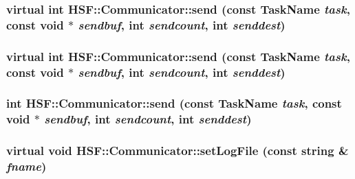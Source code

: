 \label{classHSF_1_1Communicator_a1678c6aa967e7aa1a54f760c8e6abeaa}
\hypertarget{classHSF_1_1Communicator_a29a10dcfc67e9256334db3afd37b8110}{
\subsubsection[{send}]{\setlength{\rightskip}{0pt plus 5cm}virtual int HSF::Communicator::send (const {\bf TaskName} {\em task}, \/  const void $\ast$ {\em sendbuf}, \/  int {\em sendcount}, \/  int {\em senddest})}}
\label{classHSF_1_1Communicator_a29a10dcfc67e9256334db3afd37b8110}
\hypertarget{classHSF_1_1Communicator_a29a10dcfc67e9256334db3afd37b8110}{
\subsubsection[{send}]{\setlength{\rightskip}{0pt plus 5cm}virtual int HSF::Communicator::send (const {\bf TaskName} {\em task}, \/  const void $\ast$ {\em sendbuf}, \/  int {\em sendcount}, \/  int {\em senddest})}}
\label{classHSF_1_1Communicator_a29a10dcfc67e9256334db3afd37b8110}
\hypertarget{classHSF_1_1Communicator_ab1aebbfbbeaf4275b5d127f791a1a00b}{
\subsubsection[{send}]{\setlength{\rightskip}{0pt plus 5cm}int HSF::Communicator::send (const {\bf TaskName} {\em task}, \/  const void $\ast$ {\em sendbuf}, \/  int {\em sendcount}, \/  int {\em senddest})}}
\label{classHSF_1_1Communicator_ab1aebbfbbeaf4275b5d127f791a1a00b}
\hypertarget{classHSF_1_1Communicator_a0c67eacadd200a1f385bf1487561d05d}{
\subsubsection[{setLogFile}]{\setlength{\rightskip}{0pt plus 5cm}virtual void HSF::Communicator::setLogFile (const string \& {\em fname})}}
